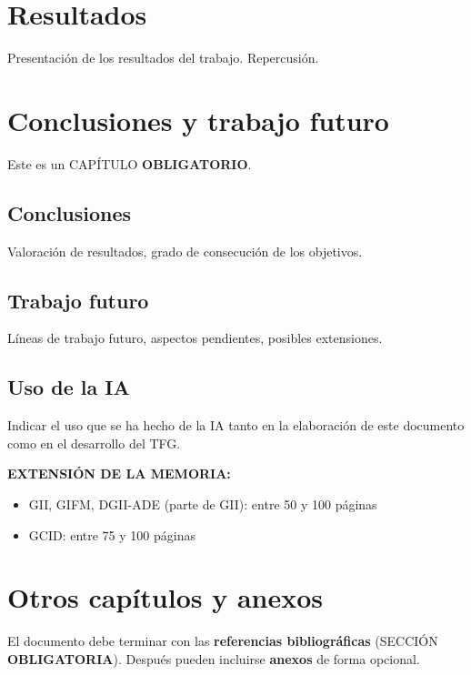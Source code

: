 \documentclass[oneside,12pt]{book}
\begin{document}
\chapter{Resultados}
%

Presentación de los resultados del trabajo. Repercusión.

\chapter{Conclusiones y trabajo futuro}
%
Este es un CAPÍTULO \textbf{OBLIGATORIO}.

\section{Conclusiones}

Valoración de resultados, grado de consecución de los  objetivos.

\section{Trabajo futuro}

Líneas de trabajo futuro, aspectos pendientes, posibles extensiones.

\section{Uso de la IA}

Indicar el uso que se ha hecho de la IA tanto en la elaboración de este documento como en el desarrollo del TFG.

\vspace{1cm}

\textbf{EXTENSIÓN DE LA MEMORIA:}

\begin{itemize}
    \item GII, GIFM, DGII-ADE (parte de GII): entre 50 y 100 páginas
    \item GCID: entre 75 y 100 páginas
\end{itemize}

\chapter{Otros capítulos y anexos}

El documento debe terminar con las \textbf{referencias bibliográficas} (SECCIÓN \textbf{OBLIGATORIA}). Después pueden incluirse \textbf{anexos} de forma opcional.
\end{document}
